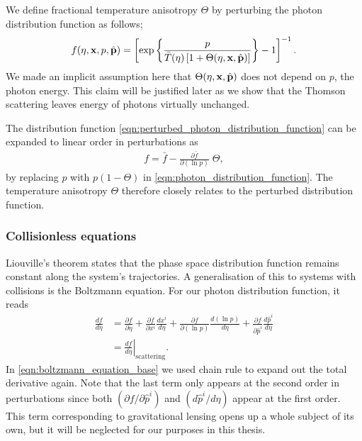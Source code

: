 We define fractional temperature anisotropy $\Theta$ by perturbing the photon distribution function as follows;
\begin{align}
	f(\eta, \mathbf{x}, p, \hat{\mathbf{p}}) = \left[ \exp \left\{ \frac{p}{\bar{T}(\eta)\left[1 + \Theta (\eta,\mathbf{x},\hat{\mathbf{p}}) \right]} \right\} - 1 \right]^{-1}. \label{eqn:perturbed_photon_distribution_function}
\end{align}
We made an implicit assumption here that $\Theta(\eta,\mathbf{x},\hat{\mathbf{p}})$ does not depend on $p$, the photon energy. This claim will be justified later as we show that the Thomson scattering leaves energy of photons virtually unchanged.

The distribution function \eqref{eqn:perturbed_photon_distribution_function} can be expanded to linear order in perturbations as
\begin{align}
	f = \bar{f} - \frac{\partial \bar{f}}{\partial (\ln p)} \; \Theta,  \label{eqn:perturbed_photon_distribution_function_expansion}
\end{align}
by replacing $p$ with $p(1-\Theta)$ in \eqref{eqn:photon_distribution_function}. The temperature anisotropy $\Theta$ therefore closely relates to the perturbed distribution function.

\subsubsection*{Collisionless equations} \label{section:collisionless_equation}

Liouville's theorem states that the phase space distribution function remains constant along the system's trajectories. A generalisation of this to systems with collisions is the Boltzmann equation. For our photon distribution function, it reads
\begin{align}
	\frac{df}{d\eta} &= \frac{\partial f}{\partial \eta} + \frac{\partial f}{\partial x^i}\frac{dx^i}{d\eta} + \frac{\partial f}{\partial(\ln  p)}\frac{d(\ln p)}{d\eta} + \frac{\partial f}{\partial \hat{p}^i}\frac{d\hat{p}^i}{d\eta} \label{eqn:boltzmann_equation_base}\\
	&= \left. \frac{df}{d\eta} \right|_\text{scattering} . \label{eqn:boltzmann_equation_base_scattering}
\end{align}
In \eqref{eqn:boltzmann_equation_base} we used chain rule to expand out the total derivative again. Note that the last term only appears at the second order in perturbations since both $(\partial f/\partial \hat{p}^i)$ and $(d\hat{p}^i/d\eta)$ appear at the first order. This term corresponding to gravitational lensing opens up a whole subject of its own, but it will be neglected for our purposes in this thesis.

